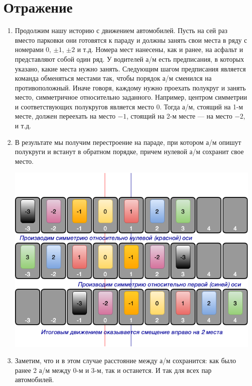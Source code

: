 \newpage

\section{Отражение}



\begin{enumerate}
\item Продолжим нашу историю с движением автомобилей. Пусть на сей раз вместо парковки они готовятся к параду и должны занять свои места в ряду с номерами 0, $\pm 1$, $\pm 2$ и т.д. Номера мест нанесены, как и ранее, на асфальт и представляют собой один ряд. У водителей а/м есть предписания, в которых указано, какие места нужно занять. Следующим шагом предписания является команда обменяться местами так, чтобы порядок а/м сменился на противоположный. Иначе говоря, каждому нужно проехать полукруг и занять место, симметричное относительно заданного. Например, центром симметрии и соответствующих полукругов является место 0. Тогда а/м, стоящий на 1-м месте, должен переехать на место $-1$, стоящий на 2-м месте --- на место $-2$, и т.д.
\item В результате мы получим перестроение на параде, при котором а/м опишут полукруги и встанут в обратном порядке, причем нулевой а/м сохранит свое место.
\begin{center}
\includegraphics[scale=0.6]{SST.png}
\end{center}
\item Заметим, что и в этом случае расстояние между а/м сохранится: как было ранее 2 а/м между 0-м и 3-м, так и останется. И так для всех пар автомобилей.

\end{enumerate}
